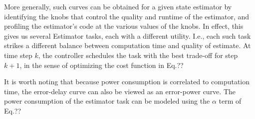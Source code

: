 More generally, such curves can be obtained for a given state estimator by identifying the knobs that control the quality and runtime of the estimator, and profiling the estimator's code at the various values of the knobs.
In effect, this gives us several Estimator tasks, each with a different utility. 
I.e., each such task strikes a different balance between computation time and quality of estimate.
At time step $k$, the controller schedules the task with the best trade-off for step $k+1$, in the sense of optimizing the cost function in Eq.??

It is worth noting that because power consumption is correlated to computation time, the error-delay curve can also be viewed as an error-power curve.
The power consumption of the estimator task can be modeled using the $\alpha$ term of Eq.??

